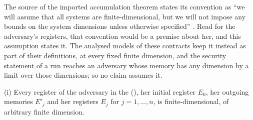 
The source of the imported accumulation theorem states its convention as
``we will assume that all systems are finite-dimensional, but we will not
impose any bounds on the system dimensions unless otherwise specified''
\cite[Sec.~2, the convention stated below its Table~1]{arqand2025meat}. Read for the adversary's registers, that convention would
be a premise about her, and this assumption states it. The analysed models
of these contracts keep it instead as part of their definitions, at every
fixed finite dimension, and the security statement of a run reaches an
adversary whose memory has any dimension by a limit over those dimensions;
so no claim assumes it.

\begin{assumption}\label{ass:eve-dim}
(i) Every register of the adversary in the 
(), her initial register $E_0$, her
outgoing memories $E'_j$ and her registers $E_j$ for $j=1,\dots,n$, is
finite-dimensional, of arbitrary finite dimension.
\end{assumption}
